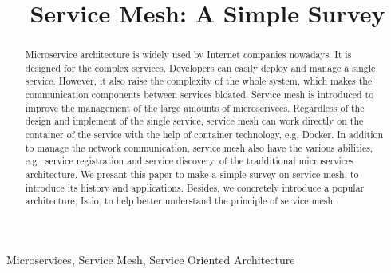 \documentclass[conference]{IEEEtran}
\begin{document}
\title{Service Mesh: A Simple Survey}

\iffalse
\author{\IEEEauthorblockN{1\textsuperscript{st} Given Name Surname}
  \IEEEauthorblockA{\textit{dept. name of organization (of Aff.)} \\
  \textit{name of organization (of Aff.)}\\
  City, Country \\
  email address}
\and
  \IEEEauthorblockN{2\textsuperscript{nd} Given Name Surname}
  \IEEEauthorblockA{\textit{dept. name of organization (of Aff.)} \\
  \textit{name of organization (of Aff.)}\\
  City, Country \\
  email address}
\and
  \IEEEauthorblockN{3\textsuperscript{rd} Given Name Surname}
  \IEEEauthorblockA{\textit{dept. name of organization (of Aff.)} \\
  \textit{name of organization (of Aff.)}\\
  City, Country \\
  email address}
}
\fi

\maketitle

\begin{abstract}
Microservice architecture is widely used by Internet companies nowadays.
It is designed for the complex services.
Developers can easily deploy and manage a single service.
However, it also raise the complexity of the whole system, which makes the communication components between services bloated.
Service mesh is introduced to improve the management of the large amounts of microserivces.
Regardless of the design and implement of the single service, service mesh can work directly on the container of the service with the help of container technology, e.g. Docker.
In addition to manage the network communication, service mesh also have the various abilities, e.g., service registration and service discovery, of the tradditional microservices architecture.
We presant this paper to make a simple survey on service mesh, to introduce its history and applications.
Besides, we concretely introduce a popular architecture, Istio, to help better understand the principle of service mesh.
\cite{li2019service}
\end{abstract}

\begin{IEEEkeywords}
  Microservices, Service Mesh, Service Oriented Architecture
\end{IEEEkeywords}
\end{document}
